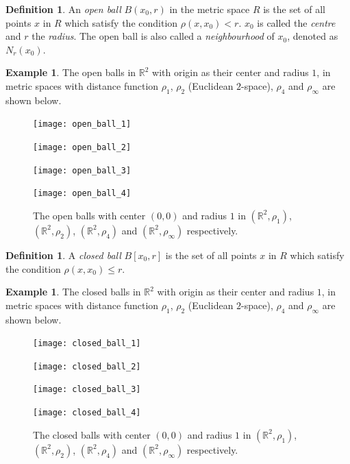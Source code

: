 \documentclass[a4paper,12pt]{article}
\newcommand{\realR}{\mathbb{R}}
\theoremstyle{definition}
\newtheorem{defn}[thm]{Definition}
\newtheorem{expl}[thm]{Example}
\theoremstyle{remark}
\begin{document}
\begin{defn}
  An \emph{open ball} $B(x_0, r)$ in the metric space $R$ is the set of all points $x$ in $R$ which satisfy the condition $\rho(x, x_0) < r$. $x_0$ is called the \emph{centre} and $r$ the \emph{radius}. The open ball is also called a \emph{neighbourhood} of $x_0$, denoted as $N_r(x_0)$.
\end{defn}
\begin{expl}
  The open balls in $\realR^2$ with origin as their center and radius $1$, in metric spaces with distance function $\rho_1$, $\rho_2$ (Euclidean $2$-space), $\rho_4$ and $\rho_{\infty}$ are shown below.
  \begin{figure}[h]
    \centering
    \begin{minipage}[t]{0.24\linewidth}
      \texttt{[image: open\_ball\_1]}
    \end{minipage}
    \begin{minipage}[t]{0.24\linewidth}
      \texttt{[image: open\_ball\_2]}
    \end{minipage}
    \begin{minipage}[t]{0.24\linewidth}
      \texttt{[image: open\_ball\_3]}
    \end{minipage}
    \begin{minipage}[t]{0.24\linewidth}
      \texttt{[image: open\_ball\_4]}
    \end{minipage}
    \caption{The open balls with center $(0,0)$ and radius $1$ in $(\realR^2, \rho_1)$, $(\realR^2, \rho_2)$, $(\realR^2, \rho_4)$ and $(\realR^2, \rho_{\infty})$ respectively.}
  \end{figure}
\end{expl}

\begin{defn}
  A \emph{closed ball} $B[x_0, r]$ is the set of all points $x$ in $R$ which satisfy the condition $\rho(x, x_0) \leq r$.
\end{defn}
\begin{expl}
  The closed balls in $\realR^2$ with origin as their center and radius $1$, in metric spaces with distance function $\rho_1$, $\rho_2$ (Euclidean $2$-space), $\rho_4$ and $\rho_{\infty}$ are shown below.
  \begin{figure}[h]
    \centering
    \begin{minipage}[t]{0.24\linewidth}
      \texttt{[image: closed\_ball\_1]}
    \end{minipage}
    \begin{minipage}[t]{0.24\linewidth}
      \texttt{[image: closed\_ball\_2]}
    \end{minipage}
    \begin{minipage}[t]{0.24\linewidth}
      \texttt{[image: closed\_ball\_3]}
    \end{minipage}
    \begin{minipage}[t]{0.24\linewidth}
      \texttt{[image: closed\_ball\_4]}
    \end{minipage}
    \caption{The closed balls with center $(0,0)$ and radius $1$ in $(\realR^2, \rho_1)$, $(\realR^2, \rho_2)$, $(\realR^2, \rho_4)$ and $(\realR^2, \rho_{\infty})$ respectively.}
  \end{figure}
\end{expl}
\end{document}
